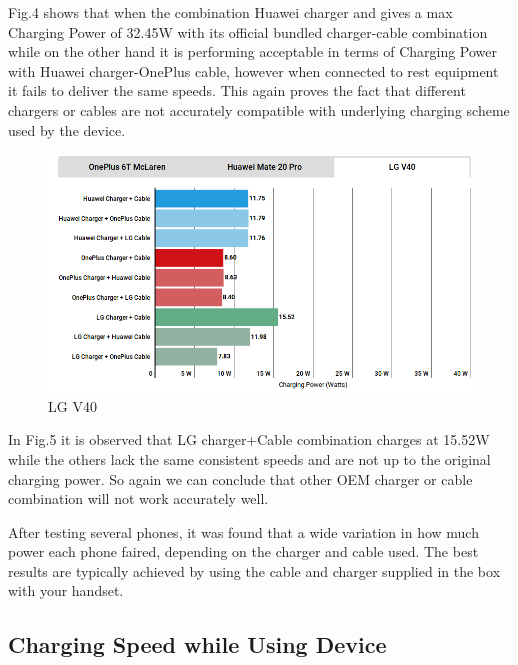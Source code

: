 \documentclass[conference]{IEEEtran}
\begin{document}
Fig.4 shows that when the combination Huawei charger and gives a max Charging Power of 32.45W with its official bundled charger-cable combination while on the other hand it is performing acceptable in terms of Charging Power with Huawei charger-OnePlus cable, however when connected to rest equipment it fails to deliver the same speeds. This again proves the fact that different chargers or cables are not accurately compatible with underlying charging scheme used by the device.  

\begin{figure}[h!]
  \includegraphics[width=\linewidth]{images/image5.png}
  \caption{LG V40\cite{b13}}
\end{figure}


In Fig.5 it is observed that LG charger+Cable combination charges at 15.52W while the others lack the same consistent speeds and are not up to the original charging power. So again we can conclude that other OEM charger or cable combination will not work accurately well. 

After testing several phones, it was found that a wide variation in how much power each phone faired, depending on the charger and cable used. The best results are typically achieved by using the cable and charger supplied in the box with your handset.

\subsection{Charging Speed while Using Device}
\end{document}
